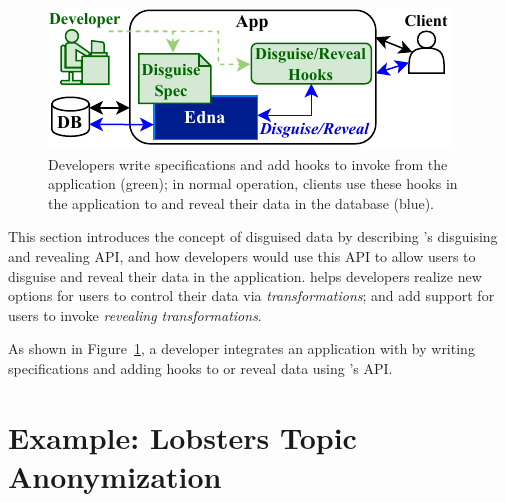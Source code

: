 \begin{figure}[h!]
  \centering
    \includegraphics{figs/edna_overview}
    \caption[Developers write disguise specifications and add hooks to invoke
    Edna's API.]{Developers write \xx specifications and add hooks to invoke
    \sys from the application (green); in normal operation, clients use these
    hooks in the application to \xx and reveal their data in the database
    (blue).}
  \label{f:edna-overview}
\end{figure}
%

This section introduces the concept of disguised data by describing \sys's
disguising and revealing API, and how developers would use this API to allow
users to disguise and reveal their data in the application.
%
\sys helps developers realize new options for users to control their data
via \emph{\xxing transformations}; and add support for users to invoke
\emph{revealing transformations}.
%


As shown in Figure~\ref{f:edna-overview}, a developer integrates an application
with \sys by writing \xx specifications and adding hooks to \xx or reveal data
using \sys's API. 



\section{Example: Lobsters Topic Anonymization}
\label{s:design:lobsters}

